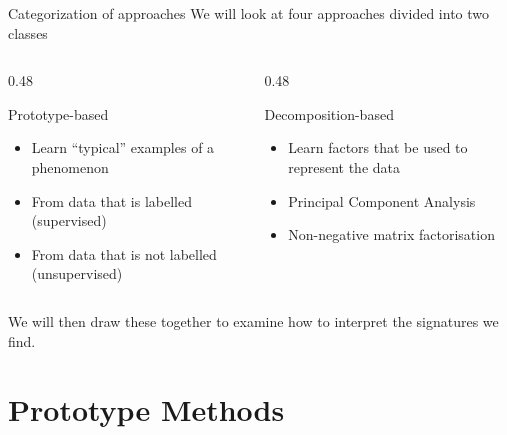 \documentclass[aspectratio=169]{beamer}
\begin{document}
\begin{frame}{Categorization of approaches}
  We will look at four approaches divided into two classes
    \begin{columns}[t]
        \begin{column}{0.48\textwidth}
            \begin{block}{Prototype-based}
              \begin{itemize}
                \item Learn ``typical'' examples of a phenomenon
                \item From data that is labelled (supervised)
                \item From data that is not labelled (unsupervised)
              \end{itemize}
            \end{block}
        \end{column}
        \begin{column}{0.48\textwidth}
            \begin{block}{Decomposition-based}
              \begin{itemize}
                \item Learn factors that be used to represent the data
                \item Principal Component Analysis
                \item Non-negative matrix factorisation
              \end{itemize}
            \end{block}
          \end{column}
    \end{columns}
  We will then draw these together to examine how to interpret the signatures we find.
\end{frame}





\section{Prototype Methods}
\end{document}
